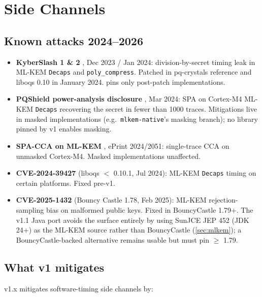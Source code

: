\section{Side Channels}
\label{sec:side-channels}

\subsection{Known attacks 2024--2026}

\begin{itemize}
\item \textbf{KyberSlash 1 \& 2} \citep{kyberslash}, Dec 2023 / Jan 2024: division-by-secret timing leak in ML-KEM \texttt{Decaps} and \texttt{poly\_compress}. Patched in pq-crystals reference and liboqs 0.10 in January 2024. \pqcrypt{} pins only post-patch implementations.
\item \textbf{PQShield power-analysis disclosure} \citep{pqshield2024}, Mar 2024: SPA on Cortex-M4 ML-KEM \texttt{Decaps} recovering the secret in fewer than 1000 traces. Mitigations live in masked implementations (e.g.\ \texttt{mlkem-native}'s masking branch); no library pinned by v1 enables masking.
\item \textbf{SPA-CCA on ML-KEM} \citep{guo2024spa}, ePrint 2024/2051: single-trace CCA on unmasked Cortex-M4. Masked implementations unaffected.
\item \textbf{CVE-2024-39427} (liboqs $<$ 0.10.1, Jul 2024): ML-KEM \texttt{Decaps} timing on certain platforms. Fixed pre-v1.
\item \textbf{CVE-2025-1432} (Bouncy Castle 1.78, Feb 2025): ML-KEM rejection-sampling bias on malformed public keys. Fixed in BouncyCastle 1.79+. The v1.1 Java port avoids the surface entirely by using SunJCE JEP 452 (JDK 24+) as the ML-KEM source rather than BouncyCastle (\cref{sec:mlkem}); a BouncyCastle-backed alternative remains usable but must pin $\geq$ 1.79.
\end{itemize}

\subsection{What v1 mitigates}

\pqcrypt{} v1.x mitigates software-timing side channels by:

